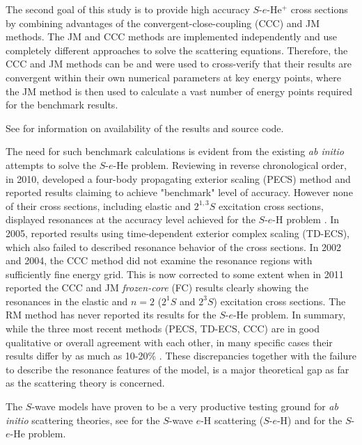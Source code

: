\documentclass[aip
, pra
, showpacs
, aps
, twocolumn
, groupedaddress
, floatfix
]{revtex4}
\begin{document}
The second goal of this study is to provide high accuracy $S$-$e$-He$^+$ cross sections by combining advantages of the convergent-close-coupling (CCC) and JM methods.
The JM and CCC methods are implemented independently and use completely different approaches to solve the scattering equations.
Therefore, the CCC and JM methods can be and were used to cross-verify that their results are convergent within their own numerical parameters at key energy points,
where the JM method is then used \cite{HY74p1201,BR76p1491} to calculate a vast number of energy points required for the benchmark results.


See \cite{JMatrixWebsite} for information on availability of the results and source code.



The need for such benchmark calculations is evident from the existing {\em ab initio} attempts to solve the $S$-$e$-He problem.
Reviewing in reverse chronological order, in 2010, \citet{BS10p022715} developed a four-body propagating exterior scaling (PECS) method and reported results claiming to achieve "benchmark" level of accuracy.
However none of their cross sections, including elastic and $2^{1,3}S$ excitation cross sections, displayed resonances at the accuracy level achieved for the $S$-$e$-H problem \cite{P78}.
In 2005, \citet{HMR05} reported results using
time-dependent exterior complex scaling (TD-ECS), which also failed to described resonance behavior of the cross sections.
In 2002 and 2004, the CCC method \cite{PBFS02,PNBFS04} did not examine the resonance regions with sufficiently fine energy grid.
This is now corrected to some extent when in 2011 \citet{KFB11} reported the CCC and JM {\em frozen-core}
(FC) results clearly showing the resonances in the elastic and $n=2$ ($2^1S$ and $2^3S$) excitation cross sections.
The RM method \cite{FLRS94b, SMC2006} has never reported its results for the $S$-$e$-He problem.
In summary, while the three most recent methods (PECS, TD-ECS, CCC) are in good qualitative or overall agreement with each other,
in many specific cases their results differ by as much as 10-20\% \cite{BS10p022715,HMR05}.
These discrepancies together with the failure to describe the resonance features of the model,
is a major theoretical gap as far as the scattering theory is concerned.



The $S$-wave models have proven to be a very productive testing ground for {\it ab initio} scattering theories,
see \cite{T62,HY74p1209,P78,P80,P81,CO84,BS92p53,BST93,KM94pL407,IDHF95,PS96,JS02,JS00l,BRIM99,S99l,MHR02,BS04,Frapiccini10} for the $S$-wave $e$-H scattering ($S$-$e$-H)
and \cite{DHIF94,PMR99,PBFS02,PNBFS04,HMR05R,HMR05,BS10p022715,BS10p022716,KFB11} for  the $S$-$e$-He problem.
\end{document}
